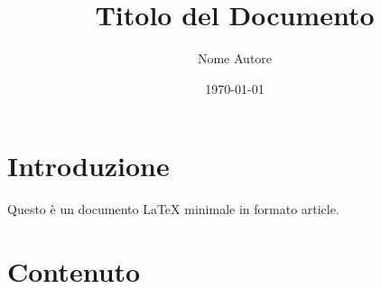 \documentclass{article}
\begin{document}
	
	\title{Titolo del Documento}
	\author{Nome Autore}
	\date{\today} %
	
	\maketitle
	
	\section{Introduzione}
	Questo è un documento LaTeX minimale in formato article.
	
	\section{Contenuto}
	\lipsum[1] %
	
\end{document}
